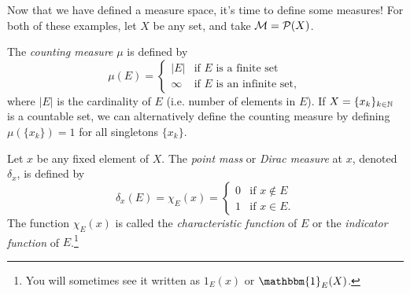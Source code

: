 \documentclass[main.tex]{subfiles}
\begin{document}
Now that we have defined a measure space, it's time to define some measures! For both of these examples, let $X$ be any set, and take ${\mathcal M} = {\mathcal P}(X)$. 
\begin{remunerate}
\item The \emph{counting measure} $\mu$ is defined by
\begin{equation}\label{eq:meas:counting}
\mu(E) = \begin{cases}
|E| & \text{if $E$ is a finite set} \\
\infty & \text{if $E$ is an infinite set},
\end{cases}
\end{equation}
where $|E|$ is the cardinality of $E$ (i.e. number of elements in $E$). If $X = \{ x_k \}_{k \in {\mathbb N}}$ is a countable set, we can alternatively define the counting measure by defining $\mu\left( \{ x_k \}\right) = 1$ for all singletons $\{ x_k \}$.
\item Let $x$ be any fixed element of $X$. The \emph{point mass} or \emph{Dirac measure} at $x$, denoted $\delta_{x}$, is defined by
\begin{equation}\label{eq:meas:dirac}
\delta_{x}(E) = \chi_E(x) = \begin{cases}
0 & \text{if $x \notin E$} \\
1 & \text{if $x \in E$}.
\end{cases}
\end{equation}
The function $\chi_E(x)$ is called the \emph{characteristic function} of $E$ or the \emph{indicator function} of $E$.\footnote{You will sometimes see it written as $1_E(x)$ or $\mathbbm{1}_E(X)$.}
\end{remunerate}
\end{document}
